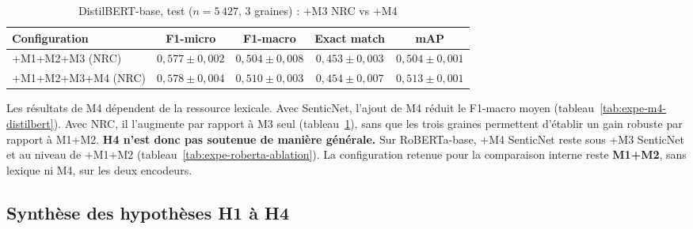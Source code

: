 \begin{table}[H]
\centering
\caption{DistilBERT-base, test ($n{=}5\,427$, 3 graines) : +M3 NRC vs +M4}
\label{tab:expe-m4-nrc-distilbert}
\renewcommand{\arraystretch}{1.2}
\setlength{\tabcolsep}{3.5pt}
\small
\begin{tabular}{|l|c|c|c|c|}
\hline
\textbf{Configuration} & \textbf{F1-micro} & \textbf{F1-macro} & \textbf{Exact match} & \textbf{mAP} \\
\hline
+M1+M2+M3 (NRC) & $0{,}577 \pm 0{,}002$ & $0{,}504 \pm 0{,}008$ & $0{,}453 \pm 0{,}003$ & $0{,}504 \pm 0{,}001$ \\
\hline
+M1+M2+M3+M4 (NRC) & $0{,}578 \pm 0{,}004$ & $0{,}510 \pm 0{,}003$ & $0{,}454 \pm 0{,}007$ & $0{,}513 \pm 0{,}001$ \\
\hline
\end{tabular}
\end{table}

Les résultats de M4 dépendent de la ressource lexicale. Avec SenticNet,
l'ajout de M4 réduit le F1-macro moyen
(tableau~\ref{tab:expe-m4-distilbert}). Avec NRC, il l'augmente par
rapport à M3 seul (tableau~\ref{tab:expe-m4-nrc-distilbert}), sans que
les trois graines permettent d'établir un gain robuste par rapport à
M1+M2. \textbf{H4 n'est donc pas soutenue de manière générale.} Sur
RoBERTa-base, +M4 SenticNet reste sous +M3 SenticNet et au niveau de
+M1+M2 (tableau~\ref{tab:expe-roberta-ablation}). La configuration
retenue pour la comparaison interne reste \textbf{M1+M2}, sans lexique
ni M4, sur les deux encodeurs.

\subsection{Synthèse des hypothèses H1 à H4}
\label{sec:expe-hypotheses-synthese}

